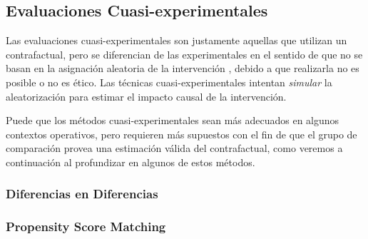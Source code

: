 \documentclass[../../main.tex]{subfiles}
\begin{document}
\subsection{Evaluaciones Cuasi-experimentales}

Las evaluaciones cuasi-experimentales son justamente aquellas que utilizan un contrafactual, pero se diferencian de las experimentales en el sentido de que no se basan en la asignación aleatoria de la intervención \cite{gertler-2016}, debido a que realizarla no es posible o no es ético. Las técnicas cuasi-experimentales intentan \textit{simular} la aleatorización para estimar el impacto causal de la intervención.


Puede que los métodos cuasi-experimentales sean más adecuados en algunos contextos operativos, pero requieren más supuestos con el fin de que el grupo de comparación provea una estimación válida del contrafactual, como veremos a continuación al profundizar en algunos de estos métodos.

\subsubsection{Diferencias en Diferencias}

\subsubsection{Propensity Score Matching}

\end{document}
